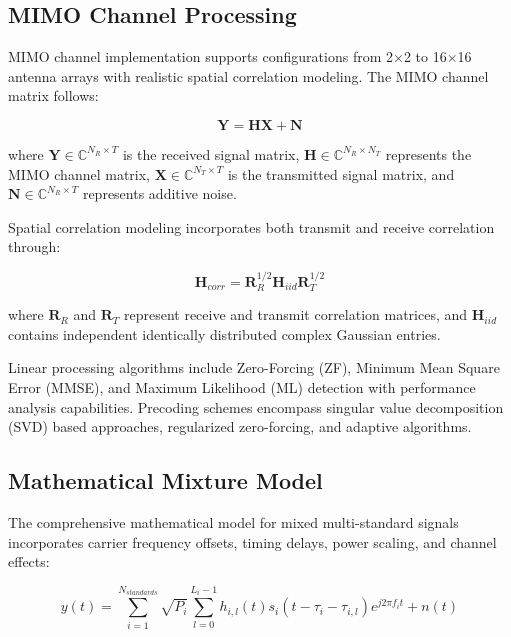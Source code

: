 \documentclass[twocolumn]{article}
\begin{document}
\subsection{MIMO Channel Processing}

MIMO channel implementation supports configurations from 2$\times$2 to 16$\times$16 antenna arrays with realistic spatial correlation modeling. The MIMO channel matrix follows:

\begin{equation}
\mathbf{Y} = \mathbf{H} \mathbf{X} + \mathbf{N}
\end{equation}

where $\mathbf{Y} \in \mathbb{C}^{N_R \times T}$ is the received signal matrix, $\mathbf{H} \in \mathbb{C}^{N_R \times N_T}$ represents the MIMO channel matrix, $\mathbf{X} \in \mathbb{C}^{N_T \times T}$ is the transmitted signal matrix, and $\mathbf{N} \in \mathbb{C}^{N_R \times T}$ represents additive noise.

Spatial correlation modeling incorporates both transmit and receive correlation through:

\begin{equation}
\mathbf{H}_{corr} = \mathbf{R}_R^{1/2} \mathbf{H}_{iid} \mathbf{R}_T^{1/2}
\end{equation}

where $\mathbf{R}_R$ and $\mathbf{R}_T$ represent receive and transmit correlation matrices, and $\mathbf{H}_{iid}$ contains independent identically distributed complex Gaussian entries.

Linear processing algorithms include Zero-Forcing (ZF), Minimum Mean Square Error (MMSE), and Maximum Likelihood (ML) detection with performance analysis capabilities. Precoding schemes encompass singular value decomposition (SVD) based approaches, regularized zero-forcing, and adaptive algorithms.

\subsection{Mathematical Mixture Model}

The comprehensive mathematical model for mixed multi-standard signals incorporates carrier frequency offsets, timing delays, power scaling, and channel effects:

\begin{equation}
y(t) = \sum_{i=1}^{N_{standards}} \sqrt{P_i} \sum_{l=0}^{L_i-1} h_{i,l}(t) s_i(t-\tau_i-\tau_{i,l}) e^{j2\pi f_i t} + n(t)
\end{equation}
\end{document}
